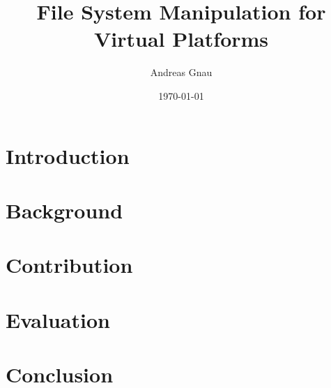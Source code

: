 \documentclass{beamer}
\title[File System Manipulation for Virtual Platforms]{File System Manipulation for Virtual Platforms}
\subtitle{}
\author{Andreas Gnau}
\date{\today}
\begin{document}
    

    \section[Outline]{}
    \section{Introduction}
        
        
        
    \section{Background}
        
        
        

    \section{Contribution}
        
        
    \section{Evaluation}
        
        
    \section{Conclusion}
        
        
        
        
    
%	
\end{document}

